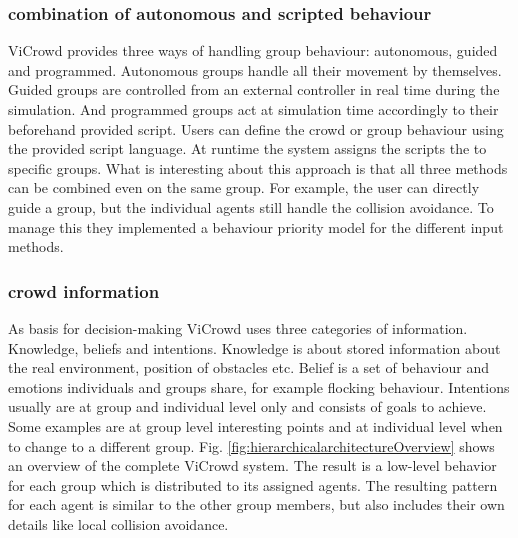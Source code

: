 \documentclass{acmsiggraph}               %
\begin{document}
\subsubsection{combination of autonomous and scripted behaviour}
ViCrowd provides three ways of handling group behaviour: autonomous, guided and programmed. 
Autonomous groups handle all their movement by themselves. Guided groups are controlled from an external controller in real time during the simulation. And programmed groups act at simulation time accordingly to their beforehand provided script. Users can define the crowd or group behaviour using the provided script language. At runtime the system assigns the scripts the to specific groups. 
What is interesting about this approach is that all three methods can be combined even on the same group. For example, the user can directly guide a group, but the individual agents still handle the collision avoidance. To manage this they implemented a behaviour priority model for the different input methods.
\subsubsection{crowd information}
As basis for decision-making ViCrowd uses three categories of information. Knowledge, beliefs and intentions. 
Knowledge is about stored information about the real environment, position of obstacles etc. 
Belief is a set of behaviour and emotions individuals and groups share, for example flocking behaviour.
Intentions usually are at group and individual level only and consists of goals to achieve. Some examples are at group level interesting points and at individual level when to change to a different group.
Fig. \ref{fig:hierarchicalarchitectureOverview} shows an overview of the complete ViCrowd system. The result is a low-level behavior for each group which is distributed to its assigned agents. The resulting pattern for each agent is similar to the other group members, but also includes their own details like local collision avoidance.
\end{document}
